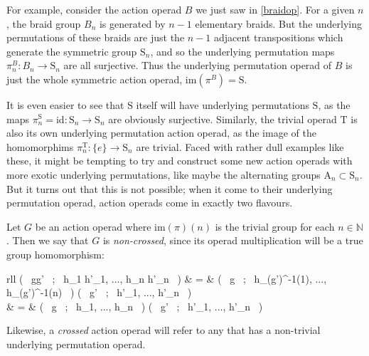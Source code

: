 For example, consider the action operad $B$ we just saw in \cref{braidop}. For a given $n$, the braid group $B_n$ is generated by $n-1$ elementary braids. But the underlying permutations of these braids are just the $n-1$ adjacent transpositions which generate the symmetric group $\mathrm{S}_n$, and so the underlying permutation maps $\pi^{B}_n : B_n \to \mathrm{S}_n$ are all surjective. Thus the underlying permutation operad of $B$ is just the whole symmetric action operad, $\mathrm{im}(\pi^B) = \mathrm{S}$.

It is even easier to see that $\mathrm{S}$ itself will have underlying permutations $\mathrm{S}$, as the maps $\pi^{\mathrm{S}}_n = \mathrm{id} : \mathrm{S}_n \to \mathrm{S}_n$ are obviously surjective. Similarly, the trivial operad $\mathrm{T}$ is also its own underlying permutation action operad, as the image of the homomorphims $\pi^{\mathrm{T}}_n : \{ e \} \to \mathrm{S}_n$ are trivial. Faced with rather dull examples like these, it might be tempting to try and construct some new action operads with more exotic underlying permutations, like maybe the alternating groups $\mathrm{A}_n \subset \mathrm{S}_n$. But it turns out that this is not possible; when it come to their underlying permutation operad, action operads come in exactly two flavours.

\begin{defn} Let $G$ be an action operad where $\mathrm{im}(\pi)(n)$ is the trivial group for each $n \in \mathbb{N}$. Then we say that $G$ is \emph{non-crossed}, since its operad multiplication will be a true group homomorphism:
\begin{eq*} \begin{array}{rll}
			\mu( \, gg' \, ; \, h_1 h'_1, ..., h_n h'_n \, ) & = & \mu( \, g \, ; \, h_{\pi(g')^{-1}(1)}, ..., h_{\pi(g')^{-1}(n)} \, ) \mu( \, g' \, ; \, h'_1, ..., h'_n \, ) \\
			& = & \mu( \, g \, ; \, h_1, ..., h_n \, ) \mu( \, g' \, ; \, h'_1, ..., h'_n \, ) \\
		\end{array}
\end{eq*}
Likewise, a \emph{crossed} action operad will refer to any that has a non-trivial underlying permutation operad.
\end{defn}

